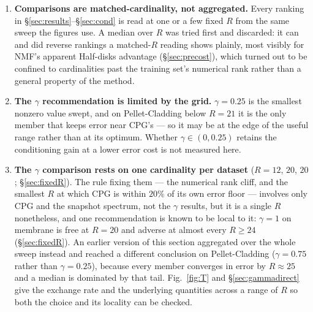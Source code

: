 \documentclass[11pt,a4paper]{article}
\begin{document}
\begin{enumerate}
of the dataset.
\item \textbf{Comparisons are matched-cardinality, not aggregated.} Every ranking in
\S\ref{sec:results}--\S\ref{sec:cond} is read at one or a few fixed $R$ from the same
sweep the figures use. A median over $R$ was tried first and discarded: it can and did
reverse rankings a matched-$R$ reading shows plainly, most visibly for NMF's apparent
Half-disks advantage (\S\ref{sec:precost}), which turned out to be confined to
cardinalities past the training set's numerical rank rather than a general property of
the method.
\item \textbf{The $\gamma$ recommendation is limited by the grid.} $\gamma=0.25$ is
the smallest nonzero value swept, and on Pellet-Cladding below $R=21$ it is the only
member that keeps error near CPG's --- so it may be at the edge of the useful range rather
than at its optimum. Whether $\gamma\in(0,0.25)$ retains the conditioning gain at a lower
error cost is not measured here.
\item\label{cav:oneR} \textbf{The $\gamma$ comparison rests on one cardinality per
dataset} ($R=12$, $20$, $20$; \S\ref{sec:fixedR}). The rule fixing them --- the numerical
rank cliff, and the smallest $R$ at which CPG is within $20\%$ of its own error floor ---
involves only CPG and the snapshot spectrum, not the $\gamma$ results, but it is a single
$R$ nonetheless, and one recommendation is known to be local to it: $\gamma=1$ on membrane
is free at $R=20$ and adverse at almost every $R\ge24$ (\S\ref{sec:fixedR}).
An earlier version of this section aggregated over the whole sweep instead and reached a
different conclusion on Pellet-Cladding ($\gamma=0.75$ rather than $\gamma=0.25$), because
every member converges in error by $R\approx25$ and a median is dominated by that tail.
Fig.~\ref{fig:T} and \S\ref{sec:gammadirect} give the exchange rate and the underlying
quantities across a range of $R$ so both the choice and its locality can be checked.
\end{enumerate}
\end{document}
